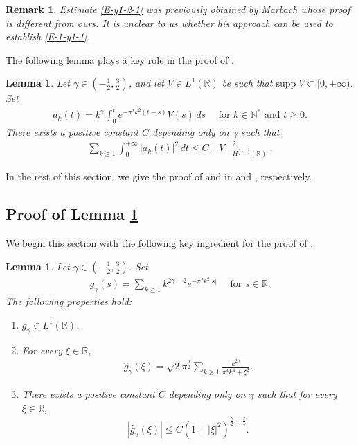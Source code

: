 \documentclass[11pt, reqno]{amsart}
\theoremstyle{plain}
\newtheorem{lemma}[thm]{Lemma}
\newtheorem{remark}{Remark}
\numberwithin{equation}{section}
\newcommand{\mR}{\mathbb{R}}
\newcommand{\mN}{\mathbb{N}}
\begin{document}
\begin{remark} \rm Estimate \eqref{E-y1-2-1} was previously obtained by Marbach \cite[Lemma 22]{Marbach18} whose proof is different from ours. It is unclear to us whether his approach can be used to establish \eqref{E-1-y1-1}. 
 \end{remark}
 

The following lemma plays a key role in the proof of .

\begin{lemma} \label{lem-spectral}
Let $\gamma \in (-\frac{1}{2}, \frac{3}{2})$, and let $V \in L^1(\mR)$ be such that $\mathrm{supp} \; V \subset [0, +\infty)$. Set 
\begin{align}	\label{lem-spectral-defak}
a_k (t) =  k^{\gamma} \int_0^t e^{- \pi^2 k^2 (t-s)} V(s) \, ds \quad \mbox{ for } k \in \mN^* \text{ and } t \geq 0.  
\end{align}
There exists a positive constant $C$ depending only on $\gamma$ such that
\begin{align}	\label{lem-spectral-ineq}
\sum_{k  \geq 1} \int_0^{+\infty} |a_k(t)|^2 \, dt \leq C \| V \|_{H^{ \frac{\gamma}{2} - \frac{3}{4} }(\mR)}^2.
\end{align}
\end{lemma}

In the rest of this section, we give the proof of  and  in  and , respectively. 




\subsection{Proof of Lemma \ref{lem-spectral}	}	\label{subsec-prooflemspectral}

We begin this section with the following key ingredient for the proof of .

\begin{lemma}	\label{lem-spectral-key-g}
	Let $\gamma \in (-\frac{1}{2}, \frac{3}{2})$. Set 
	\begin{align*}
		g_{\gamma}(s) = \sum_{k \geq 1} k^{2 \gamma - 2} e^{- \pi^2 k^2 |s|}  \quad \text{ for } s \in \mR.
	\end{align*}
	The following properties hold:
	\begin{enumerate}
	\item[1)] $g_{\gamma} \in L^1(\mR)$.
	\item[2)] For every $\xi \in \mR$, 
\begin{align} \label{lem-spectral-key-g-2}	
	\hat{g}_{\gamma}(\xi) = \sqrt{2}\pi^{\frac{3}{2}} \sum_{k \geq 1} \frac{k^{2 \gamma}}{\pi^4 k^4 + \xi^2}.
\end{align}
	\item[3)] There exists a positive constant $C$ depending only on $\gamma$ such that for every $\xi \in \mR$,
	\begin{align}	\label{lem-spectral-key-g-3}
		|\hat{g}_{\gamma}(\xi)| \leq C \left(1 + |\xi|^2 \right)^{\frac{\gamma}{2} - \frac{3}{4}}.
	\end{align}
	\end{enumerate}
\end{lemma}
\end{document}
